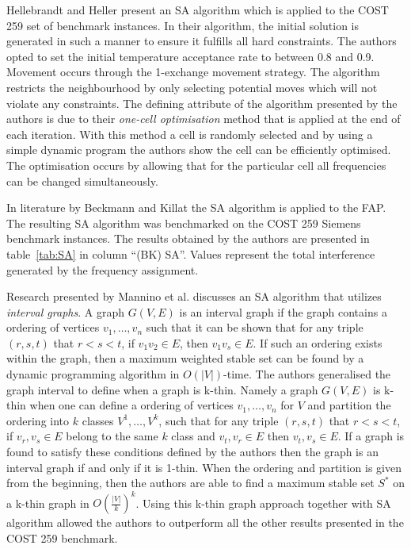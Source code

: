 Hellebrandt and Heller \cite{Hehe00} present an \gls{SA} algorithm which is applied to the COST 259 set of benchmark instances. In their algorithm, the initial solution is generated in such a manner to ensure it fulfills all hard constraints. The authors opted to set the initial temperature acceptance rate to between 0.8 and 0.9. Movement occurs through the 1-exchange movement strategy. The algorithm restricts the neighbourhood by only selecting potential moves which will not violate any constraints. The defining attribute of the algorithm presented by the authors is due to their \emph{one-cell optimisation} method that is applied at the end of each iteration. With this method a cell is randomly selected and by using a simple dynamic program the authors show the cell can be efficiently optimised. The optimisation occurs by allowing that for the particular cell all frequencies can be changed simultaneously\cite{Hehe00}. 

In literature by Beckmann and Killat\cite{BeKi99a} the \gls{SA} algorithm is applied to the \gls{FAP}. The resulting \gls{SA} algorithm was benchmarked on the \gls{COST} 259 Siemens benchmark instances. The results obtained by the authors are presented in table~\ref{tab:SA} in column ``(BK) \gls{SA}''. Values represent the total interference generated by the frequency assignment. 

Research presented by Mannino et al.\cite{MaOrRi02} discusses an \gls{SA} algorithm that utilizes \emph{interval graphs}. A graph $G(V,E)$ is an interval graph if the graph contains a ordering of vertices ${v_1,\dots,v_n}$ such that it can be shown that for any triple $(r,s,t)$ that $r < s < t$, if $v_1v_2 \in E$, then $v_1v_s \in E$. If such an ordering exists within the graph, then a maximum weighted stable set can be found by a dynamic programming algorithm in $O(|V|)$-time. The authors generalised the graph interval to define when a graph is k-thin. Namely a graph $G(V,E)$ is k-thin when one can define a ordering of vertices ${v_1,\dots,v_n}$ for $V$ and partition the ordering into $k$ classes $V^1,\dots,V^k$, such that for any triple $(r,s,t)$ that $r < s < t$, if $v_r,v_s \in E$ belong to the same $k$ class and $v_t,v_r \in E$ then $v_t,v_s \in E$. If a graph is found to satisfy these conditions defined by the authors then the graph is an interval graph if and only if it is 1-thin. When the ordering and partition is given from the beginning, then the authors are able to find a maximum stable set $S^*$ on a k-thin graph in $O(\frac{|V|}{k})^k$. Using this k-thin graph approach together with \gls{SA} algorithm allowed the authors to outperform all the other results presented in the \gls{COST} 259 benchmark. 

